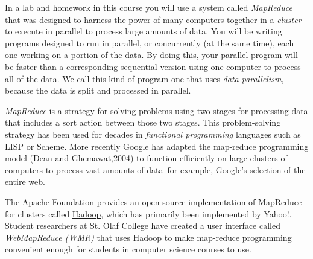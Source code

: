 \documentclass[letterpaper,10pt,openany,oneside]{sphinxmanual}
\begin{document}
In a lab and homework in this course you will use a system called
\emph{MapReduce} that was designed to harness the power of many
computers together in a \emph{cluster} to execute in parallel to process
large amounts of data. You will be writing programs designed to run
in parallel, or concurrently (at the same time), each one working
on a portion of the data. By doing this, your parallel program will
be faster than a corresponding sequential version using one
computer to process all of the data. We call this kind of program
one that uses \emph{data parallelism}, because the data is split and
processed in parallel.

\emph{MapReduce} is a strategy for solving problems using two stages for
processing data that includes a sort action between those two
stages. This problem-solving strategy has been used for decades in
\emph{functional programming} languages such as LISP or Scheme. More
recently Google has adapted the map-reduce programming model
(\href{http://labs.google.com/papers/mapreduce.html}{Dean and Ghemawat,2004})
to function efficiently on large clusters of computers to process
vast amounts of data--for example, Google's selection of the entire
web.

The Apache Foundation provides an open-source implementation of
MapReduce for clusters called
\href{http://hadoop.apache.org/core/}{Hadoop}, which has primarily
been implemented by Yahoo!. Student researchers at St. Olaf College
have created a user interface called \emph{WebMapReduce (WMR)} that uses
Hadoop to make map-reduce programming convenient enough for
students in computer science courses to use.
\end{document}

